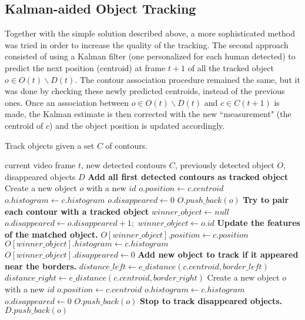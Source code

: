 \documentclass[runningheads]{llncs}
\begin{document}
\subsection{Kalman-aided Object Tracking}

Together with the simple solution described above, a more sophisticated method was tried in order to increase the quality of the tracking. The second approach consisted of using a Kalman filter (one personalized for each human detected) to predict the next position (centroid) at frame $t+1$ of all the tracked object $o \in O(t)\backslash D(t)$. The contour association procedure remained the same, but it was done by checking these newly predicted centroids, instead of the previous ones. Once an association between $o \in O(t)\backslash D(t)$ and $c \in C(t+1)$ is made, the Kalman estimate is then corrected with the new ``measurement" (the centroid of $c$) and the object position is updated accordingly.

\begin{algorithm}
\caption{Track objects given a set $C$ of contours.}
\label{tracking_algo}
\begin{algorithmic}[1]
\Require current video frame $t$, new detected contours $C$, previously detected object $O$, disappeared objects $D$
\State
{} \Comment \textbf{Add all first detected contours as tracked object}
\State Create a new object $o$ with a new $id$
\State $o.position \gets c.centroid$
\State $o.histogram \gets c.histogram$
\State $o.disappeared \gets 0$
\State $O.push\_back(o)$
\EndFor
\Else
{} \Comment \textbf{Try to pair each contour with a tracked object}
\State $winner\_object \gets null$
\State $o.disappeared \gets o.disappeared+1;$
\State $winner\_object \gets o.id$
\EndIf
\EndIf
\EndIf
\EndFor 
{} 
\State \Comment \textbf{Update the features of the matched object.}
\State $O[winner\_object].position \gets c.position $
\State $O[winner\_object].histogram \gets c.histogram$
\State $O[winner\_object].disappeared \gets 0$
\Else
\State \Comment \textbf{Add new object to track if it appeared near the borders.}
\State $distance\_left \gets e\_distance(c.centroid, border\_left)$
\State $distance\_right \gets e\_distance(c.centroid, border\_right)$
\State Create a new object $o$ with a new $id$
\State $o.position \gets c.centroid$
\State $o.histogram \gets c.histogram$
\State $o.disappeared \gets 0$
\State $O.push\_back(o)$
\EndIf
\EndIf
\EndFor
{} \Comment \textbf{Stop to track disappeared objects.}
\State $D.push\_back(o)$
\EndIf
\EndFor
\EndIf
\end{algorithmic}
\end{algorithm}
\end{document}
